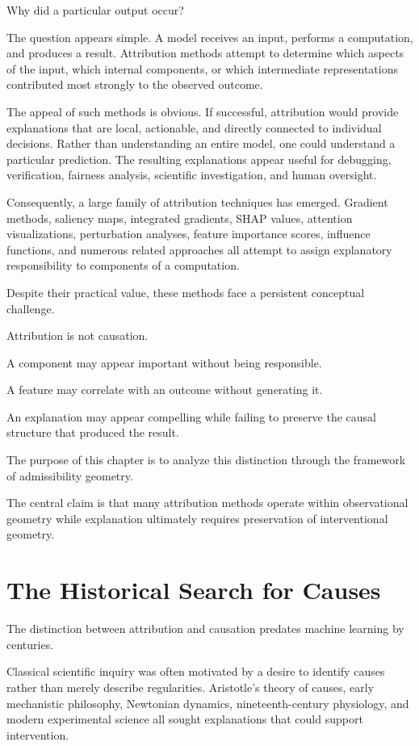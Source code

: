 \documentclass[11pt,oneside,openany]{book}
\begin{document}
Why did a particular output occur?

The question appears simple. A model receives an input, performs a computation, and produces a result. Attribution methods attempt to determine which aspects of the input, which internal components, or which intermediate representations contributed most strongly to the observed outcome.

The appeal of such methods is obvious. If successful, attribution would provide explanations that are local, actionable, and directly connected to individual decisions. Rather than understanding an entire model, one could understand a particular prediction. The resulting explanations appear useful for debugging, verification, fairness analysis, scientific investigation, and human oversight.

Consequently, a large family of attribution techniques has emerged. Gradient methods, saliency maps, integrated gradients, SHAP values, attention visualizations, perturbation analyses, feature importance scores, influence functions, and numerous related approaches all attempt to assign explanatory responsibility to components of a computation.

Despite their practical value, these methods face a persistent conceptual challenge.

Attribution is not causation.

A component may appear important without being responsible.

A feature may correlate with an outcome without generating it.

An explanation may appear compelling while failing to preserve the causal structure that produced the result.

The purpose of this chapter is to analyze this distinction through the framework of admissibility geometry.

The central claim is that many attribution methods operate within observational geometry while explanation ultimately requires preservation of interventional geometry.

\section{The Historical Search for Causes}

The distinction between attribution and causation predates machine learning by centuries.

Classical scientific inquiry was often motivated by a desire to identify causes rather than merely describe regularities. Aristotle's theory of causes, early mechanistic philosophy, Newtonian dynamics, nineteenth-century physiology, and modern experimental science all sought explanations that could support intervention.
\end{document}
